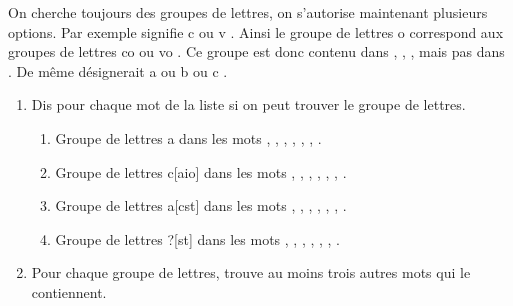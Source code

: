 \documentclass[class=report,crop=false, 12pt]{standalone}
\begin{document}
\begin{activite}

On cherche toujours des groupes de lettres, on s'autorise maintenant plusieurs options. Par exemple \og [cv] \fg{} signifie \og c \fg{} ou \og v \fg{}. Ainsi le groupe de lettres \og [cv]o \fg{} correspond aux groupes de lettres \og co \fg{} ou \og vo \fg{}. Ce groupe est donc contenu dans , , , mais pas dans . De même \og [abc] \fg{} désignerait \og a \fg{} ou \og b \fg{} ou \og c \fg{}.

\begin{enumerate}
  \item Dis pour chaque mot de la liste si on peut trouver le groupe de lettres.
  \begin{enumerate}
    \item Groupe de lettres \og [lp]a \fg{} dans les mots , , , , , , .
    \item Groupe de lettres \og c[aio] \fg{} dans les mots , , , , , , .
    \item Groupe de lettres \og [lt]a[cst] \fg{} dans les mots , , , , , , .    
    \item Groupe de lettres \og [cp]\!?[st] \fg{} dans les mots , , , , , , .
  \end{enumerate}
  
  
  \item Pour chaque groupe de lettres, trouve au moins trois autres mots qui le contiennent.
\end{enumerate}

\end{activite}
\end{document}

